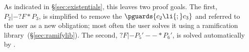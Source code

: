 As indicated in \S\ref{sec:existentials}, this leaves two proof goals.  The first, $P_2 |- ?F * P_3$, is simplified to remove the $\pguards{c_2\li{;} c_3}$ and referred to the user as a new obligation; most often the user solves it using a ramification library~(\S\ref{sec:ramifylib}).  The second, $?F |- P_5' --* P_6'$, is solved automatically by .






